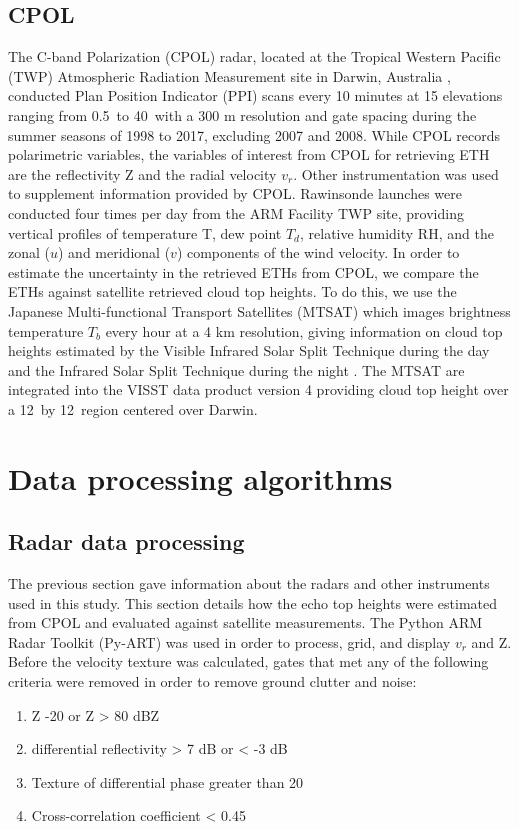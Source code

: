 \documentclass[journal abbreviation, manuscript]{copernicus}
\begin{document}
\subsection{CPOL} 

	The C-band Polarization (CPOL) radar, located at the Tropical Western Pacific (TWP) Atmospheric Radiation Measurement site in Darwin, Australia \citep{Keenanetal1999}, conducted Plan Position Indicator (PPI) scans every 10 minutes at 15 elevations ranging from 0.5\degree  \ to 40\degree  \ with a 300 m resolution and gate spacing during the summer seasons of 1998 to 2017, excluding 2007 and 2008. While CPOL records polarimetric variables, the variables of interest from CPOL for retrieving ETH are the reflectivity Z and the radial velocity $v_{r}$. Other instrumentation was used to supplement information provided by CPOL. Rawinsonde launches were conducted four times per day from the ARM Facility TWP site, providing vertical profiles of temperature T, dew point $T_d$, relative humidity RH, and the zonal ($u$) and meridional ($v$) components of the wind velocity. In order to estimate the uncertainty in the retrieved ETHs from CPOL, we compare the ETHs against satellite retrieved cloud top heights. To do this, we use the Japanese Multi-functional Transport Satellites (MTSAT) which images brightness temperature $T_{b}$ every hour at a 4 km resolution, giving information on cloud top heights estimated by the Visible Infrared Solar Split Technique during the day and the Infrared Solar Split Technique during the night \citep{Minnisetal2011}. The MTSAT are integrated into the VISST data product version 4 \citep{Minnisetal2011} providing cloud top height over a 12\degree \ by 12\degree  \ region centered over Darwin.
    
\section{Data processing algorithms}
\subsection{Radar data processing}

	The previous section gave information about the radars and other instruments used in this study. This section details how the echo top heights were estimated from CPOL and evaluated against satellite measurements. The Python ARM Radar Toolkit (Py-ART) \citep{HelmusandCollis2016} was used in order to process, grid, and display $v_{r}$ and Z. Before the velocity texture was calculated, gates that met any of the following criteria were removed in order to remove ground clutter and noise:
\begin{enumerate}
\item Z -20 or Z > 80 dBZ
\item differential reflectivity > 7 dB or < -3 dB
\item Texture of differential phase greater than 20\degree
\item Cross-correlation coefficient < 0.45
\end{enumerate}
\end{document}
